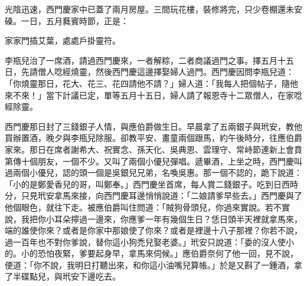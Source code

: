 光陰迅速，西門慶家中已蓋了兩月房屋。三間玩花樓，裝修將完，只少卷棚還未安磉。一日，五月蕤賓時節，正是：

家家門插艾葉，處處戶掛靈符。

李瓶兒治了一席酒，請過西門慶來，一者解粽，二者商議過門之事。擇五月十五日，先請僧人唸經燒靈，然後西門慶這邊擇娶婦人過門。西門慶因問李瓶兒道：「你燒靈那日，花大、花三、花四請他不請？」婦人道：「我每人把個帖子，隨他來不來！」當下計議已定，單等五月十五日，婦人請了報恩寺十二眾僧人，在家唸經除靈。

西門慶那日封了三錢銀子人情，與應伯爵做生日。早晨拿了五兩銀子與玳安，教他買辦置酒，晚夕與李瓶兒除服。卻教平安、畫童兩個跟馬，約午後時分，往應伯爵家來。那日在席者謝希大、祝實念、孫天化、吳典恩、雲理守、常峙節連新上會賁第傳十個朋友，一個不少。又叫了兩個小優兒彈唱。遞畢酒，上坐之時，西門慶叫過兩個小優兒，認的頭一個是吳銀兒兄弟，名喚吳惠。那一個不認的，跪下說道：「小的是鄭愛香兒的哥，叫鄭奉。」西門慶坐首席，每人賞二錢銀子。吃到日西時分，只見玳安拿馬來接，向西門慶耳邊悄悄說道：「二娘請爹早些去。」西門慶與了他個眼色，就往下走。被應伯爵叫住問道：「賊狗骨頭兒，你過來實說。若不實說，我把你小耳朵擰過一邊來，你應爹一年有幾個生日？恁日頭半天裡就拿馬來，端的誰使你來？或者是你家中那娘使了你來？或者是裡邊十八子那裡？你若不說，過一百年也不對你爹說，替你這小狗禿兒娶老婆。」玳安只說道：「委的沒人使小的。小的恐怕夜緊，爹要起身早，拿馬來伺候。」應伯爵奈何了他一回，見不說，便道：「你不說，我明日打聽出來，和你這小油嘴兒算帳。」於是又斟了一鍾酒，拿了半碟點兒，與玳安下邊吃去。

